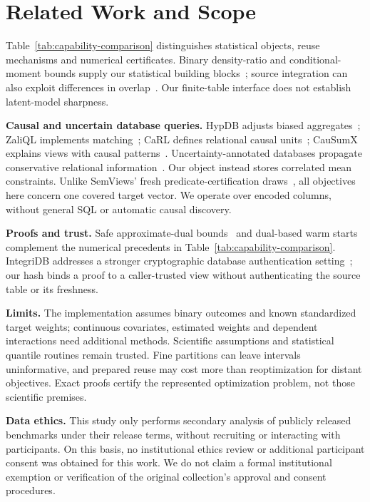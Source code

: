 \documentclass[conference]{IEEEtran}
\begin{document}
\section{Related Work and Scope}\label{sec:related}
Table~\ref{tab:capability-comparison} distinguishes statistical objects, reuse mechanisms and numerical certificates. Binary density-ratio and conditional-moment bounds supply our statistical building blocks~\cite{dorn2025dvds,ishikawa2026convex}; source integration can also exploit differences in overlap~\cite{jiang2024overlap}. Our finite-table interface does not establish latent-model sharpness.

\textbf{Causal and uncertain database queries.} HypDB adjusts biased aggregates~\cite{salimi2018hypdb}; ZaliQL implements matching~\cite{salimi2017zaliql}; CaRL defines relational causal units~\cite{salimi2020carl}; CauSumX explains views with causal patterns~\cite{youngmann2024causumx}. Uncertainty-annotated databases propagate conservative relational information~\cite{Feng2019UADB}. Our object instead stores correlated mean constraints. Unlike SemViews' fresh predicate-certification draws~\cite{Hassanzadeh2026SemanticViews}, all objectives here concern one covered target vector. We operate over encoded columns, without general SQL or automatic causal discovery.

\textbf{Proofs and trust.} Safe approximate-dual bounds~\cite{Neumaier2004SafeBounds} and dual-based warm starts~\cite{Marcucci2021WarmStart} complement the numerical precedents in Table~\ref{tab:capability-comparison}. IntegriDB addresses a stronger cryptographic database authentication setting~\cite{Zhang2015IntegriDB}; our hash binds a proof to a caller-trusted view without authenticating the source table or its freshness.

\textbf{Limits.} The implementation assumes binary outcomes and known standardized target weights; continuous covariates, estimated weights and dependent interactions need additional methods. Scientific assumptions and statistical quantile routines remain trusted. Fine partitions can leave intervals uninformative, and prepared reuse may cost more than reoptimization for distant objectives. Exact proofs certify the represented optimization problem, not those scientific premises.

\textbf{Data ethics.} This study only performs secondary analysis of publicly released benchmarks under their release terms, without recruiting or interacting with participants. On this basis, no institutional ethics review or additional participant consent was obtained for this work. We do not claim a formal institutional exemption or verification of the original collection's approval and consent procedures.
\end{document}

